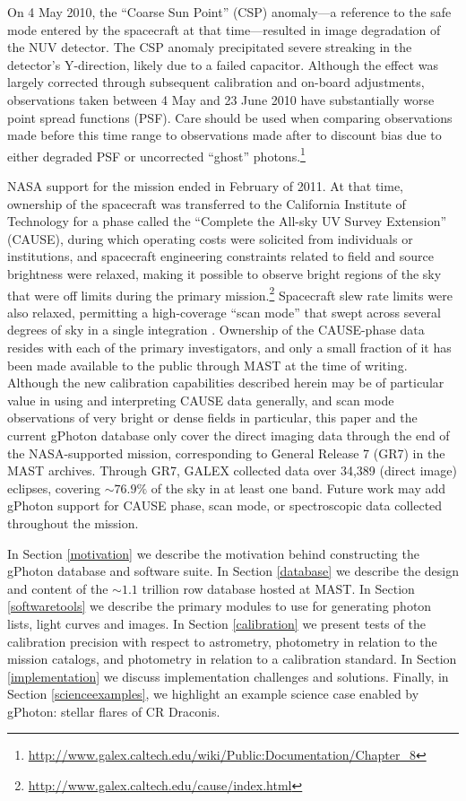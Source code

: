 \documentclass[preprint]{aastex}
\begin{document}
On 4 May 2010, the ``Coarse Sun Point'' (CSP) anomaly---a reference to the safe mode entered by the spacecraft at that time---resulted in image degradation of the NUV detector. The CSP anomaly precipitated severe streaking in the detector's Y-direction, likely due to a failed capacitor. Although the effect was largely corrected through subsequent calibration and on-board adjustments, observations taken between 4 May and 23 June 2010 have substantially worse point spread functions (PSF). Care should be used when comparing observations made before this time range to observations made after to discount bias due to either degraded PSF or uncorrected ``ghost'' photons.\footnote{\url{http://www.galex.caltech.edu/wiki/Public:Documentation/Chapter_8}}

NASA support for the mission ended in February of 2011. At that time, ownership of the spacecraft was transferred to the California Institute of Technology for a phase called the ``Complete the All-sky UV Survey Extension'' (CAUSE), during which operating costs were solicited from individuals or institutions, and spacecraft engineering constraints related to field and source brightness were relaxed, making it possible to observe bright regions of the sky that were off limits during the primary mission.\footnote{\url{http://www.galex.caltech.edu/cause/index.html}} Spacecraft slew rate limits were also relaxed, permitting a high-coverage ``scan mode'' that swept across several degrees of sky in a single integration \citep{olmedo2015deep}. Ownership of the CAUSE-phase data resides with each of the primary investigators, and only a small fraction of it has been made available to the public through MAST at the time of writing.  Although the new calibration capabilities described herein may be of particular value in using and interpreting CAUSE data generally, and scan mode observations of very bright or dense fields in particular, this paper and the current gPhoton database only cover the direct imaging data through the end of the NASA-supported mission, corresponding to General Release 7 (GR7) in the MAST archives. Through GR7, GALEX collected data over 34,389 (direct image) eclipses, covering $\sim76.9\%$ of the sky in at least one band. Future work may add gPhoton support for CAUSE phase, scan mode, or spectroscopic data collected throughout the mission.

In Section \ref{motivation} we describe the motivation behind constructing the gPhoton database and software suite. In Section \ref{database} we describe the design and content of the $\sim 1.1$ trillion row database hosted at MAST. In Section \ref{softwaretools} we describe the primary modules to use for generating photon lists, light curves and images. In Section \ref{calibration} we present tests of the calibration precision with respect to astrometry, photometry in relation to the mission catalogs, and photometry in relation to a calibration standard. In Section \ref{implementation} we discuss implementation challenges and solutions. Finally, in Section \ref{scienceexamples}, we highlight an example science case enabled by gPhoton: stellar flares of CR Draconis.
\end{document}
